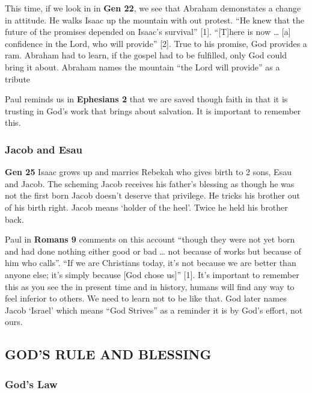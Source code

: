 \documentclass[]{article}
\begin{document}
This time, if we look in in \textbf{Gen 22}, we see that Abraham
demonstates a change in attitude. He walks Isaac up the mountain with
out protest. ``He knew that the future of the promises depended on
Isaac's survival'' {[}1{]}. ``{[}T{]}here is now \ldots{} {[}a{]}
confidence in the Lord, who will provide'' {[}2{]}. True to his promise,
God provides a ram. Abraham had to learn, if the gospel had to be
fulfilled, only God could bring it about. Abraham names the mountain
``the Lord will provide'' as a tribute

Paul reminds us in \textbf{Ephesians 2} that we are saved though faith
in that it is trusting in God's work that brings about salvation. It is
important to remember this.

\hypertarget{jacob-and-esau}{%
\subsubsection{Jacob and Esau}\label{jacob-and-esau}}

\textbf{Gen 25} Isaac grows up and marries Rebekah who gives birth to 2
sons, Esau and Jacob. The scheming Jacob receives his father's blessing
as though he was not the first born Jacob doesn't deserve that
privilege. He tricks his brother out of his birth right. Jacob means
`holder of the heel'. Twice he held his brother back.

Paul in \textbf{Romans 9} comments on this account ``though they were
not yet born and had done nothing either good or bad \ldots{} not
because of works but because of him who calls''. ``If we are Christians
today, it's not because we are better than anyone else; it's simply
because {[}God chose us{]}'' {[}1{]}. It's important to remember this as
you see the in present time and in history, humans will find any way to
feel inferior to others. We need to learn not to be like that. God later
names Jacob `Israel' which means ``God Strives'' as a reminder it is by
God's effort, not ours.

\hypertarget{gods-rule-and-blessing}{%
\subsection{GOD'S RULE AND BLESSING}\label{gods-rule-and-blessing}}

\hypertarget{gods-law}{%
\subsubsection{God's Law}\label{gods-law}}
\end{document}
